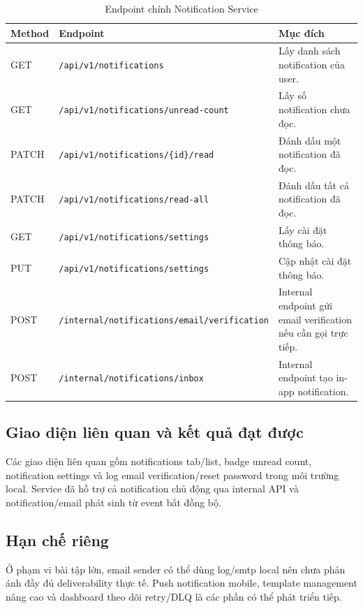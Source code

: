 \documentclass[14pt,a4paper,oneside]{extreport}
\begin{document}
\begin{table}[H]
\centering
\caption{Endpoint chính Notification Service}
\label{tab:endpoint-notification}
\renewcommand{\arraystretch}{1.3}
\scriptsize
\begin{tabularx}{\textwidth}{|l|l|X|}
\hline
\textbf{Method} & \textbf{Endpoint} & \textbf{Mục đích} \\
\hline
GET & \texttt{/api/v1/notifications} & Lấy danh sách notification của user. \\
\hline
GET & \texttt{/api/v1/notifications/unread-count} & Lấy số notification chưa đọc. \\
\hline
PATCH & \texttt{/api/v1/notifications/\{id\}/read} & Đánh dấu một notification đã đọc. \\
\hline
PATCH & \texttt{/api/v1/notifications/read-all} & Đánh dấu tất cả notification đã đọc. \\
\hline
GET & \texttt{/api/v1/notifications/settings} & Lấy cài đặt thông báo. \\
\hline
PUT & \texttt{/api/v1/notifications/settings} & Cập nhật cài đặt thông báo. \\
\hline
POST & \texttt{/internal/notifications/email/verification} & Internal endpoint gửi email verification nếu cần gọi trực tiếp. \\
\hline
POST & \texttt{/internal/notifications/inbox} & Internal endpoint tạo in-app notification. \\
\hline
\end{tabularx}
\end{table}

\subsection{Giao diện liên quan và kết quả đạt được}

Các giao diện liên quan gồm notifications tab/list, badge unread count, notification settings và log email verification/reset password trong môi trường local. Service đã hỗ trợ cả notification chủ động qua internal API và notification/email phát sinh từ event bất đồng bộ.

\subsection{Hạn chế riêng}

Ở phạm vi bài tập lớn, email sender có thể dùng log/smtp local nên chưa phản ánh đầy đủ deliverability thực tế. Push notification mobile, template management nâng cao và dashboard theo dõi retry/DLQ là các phần có thể phát triển tiếp.
\end{document}
